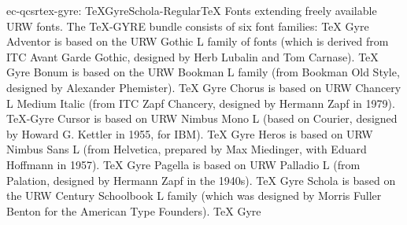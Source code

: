 \documentclass{ddltxtyp}
\begin{document}
\begin{package}{ec-qcsr}{tex-gyre: TeXGyreSchola-Regular}{{\TeX} Fonts extending freely available URW fonts.}
The {\TeX}-GYRE bundle consists of six font families: {\TeX} Gyre
Adventor is based on the URW Gothic L family of fonts (which is
derived from ITC Avant Garde Gothic, designed by Herb Lubalin
and Tom Carnase). {\TeX} Gyre Bonum is based on the URW Bookman L
family (from Bookman Old Style, designed by Alexander
Phemister). {\TeX} Gyre Chorus is based on URW Chancery L Medium
Italic (from ITC Zapf Chancery, designed by Hermann Zapf in
1979). {\TeX}-Gyre Cursor is based on URW Nimbus Mono L (based on
Courier, designed by Howard G. Kettler in 1955, for IBM). {\TeX}
Gyre Heros is based on URW Nimbus Sans L (from Helvetica,
prepared by Max Miedinger, with Eduard Hoffmann in 1957). {\TeX}
Gyre Pagella is based on URW Palladio L (from Palation,
designed by Hermann Zapf in the 1940s). {\TeX} Gyre Schola is
based on the URW Century Schoolbook L family (which was
designed by Morris Fuller Benton for the American Type
Founders). {\TeX} Gyre %
\end{package}
\end{document}
